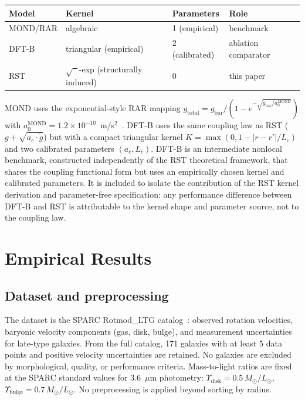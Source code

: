\documentclass[11pt,a4paper]{article}
\begin{document}
\begin{center}
\begin{tabular}{llll}
\toprule
\textbf{Model} & \textbf{Kernel} & \textbf{Parameters} & \textbf{Role} \\
\midrule
MOND/RAR & algebraic & 1 (empirical) & benchmark \\
DFT-B & triangular (empirical) & 2 (calibrated) & ablation comparator \\
RST & $\sqrt{\phantom{x}}$-exp (structurally induced) & 0 & this paper \\
\bottomrule
\end{tabular}
\end{center}

MOND uses the exponential-style RAR mapping $g_{\mathrm{total}} = g_{\mathrm{bar}} / (1 - e^{-\sqrt{g_{\mathrm{bar}}/a_0^{\mathrm{MOND}}}})$ with $a_0^{\mathrm{MOND}} = 1.2 \times 10^{-10}$~m/s$^2$~\cite{Milgrom1983,McGaugh2016}.
DFT-B uses the same coupling law as RST ($g + \sqrt{a_c \cdot \tilde{g}}$) but with a compact triangular kernel $K = \max(0, 1 - |r - r'|/L_c)$ and two calibrated parameters $(a_c, L_c)$.
DFT-B is an intermediate nonlocal benchmark, constructed independently of the RST theoretical framework, that shares the coupling functional form but uses an empirically chosen kernel and calibrated parameters.
It is included to isolate the contribution of the RST kernel derivation and parameter-free specification: any performance difference between DFT-B and RST is attributable to the kernel shape and parameter source, not to the coupling law.

\section{Empirical Results}
\label{sec:results}

\subsection{Dataset and preprocessing}

The dataset is the SPARC Rotmod\_LTG catalog~\cite{Lelli2016}: observed rotation velocities, baryonic velocity components (gas, disk, bulge), and measurement uncertainties for late-type galaxies.
From the full catalog, 171 galaxies with at least 5 data points and positive velocity uncertainties are retained.
No galaxies are excluded by morphological, quality, or performance criteria.
Mass-to-light ratios are fixed at the SPARC standard values for 3.6~$\mu$m photometry: $\Upsilon_{\mathrm{disk}} = 0.5\,M_\odot/L_\odot$, $\Upsilon_{\mathrm{bulge}} = 0.7\,M_\odot/L_\odot$.
No preprocessing is applied beyond sorting by radius.
\end{document}
